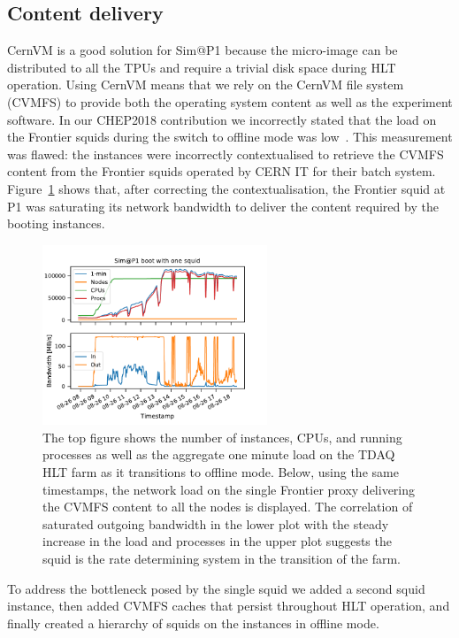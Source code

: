 \documentclass{webofc}
\begin{document}
\subsection{Content delivery}
CernVM is a good solution for Sim@P1 because the micro-image can be distributed
to all the TPUs and require a trivial disk space during HLT operation. Using
CernVM means that we rely on the CernVM file system (CVMFS) to provide both the
operating system content as well as the experiment software. In our CHEP2018
contribution we incorrectly stated that the load on the Frontier squids during
the switch to offline mode was low~\cite{Berghaus:2019wuj, Dykstra:2019}.
This measurement was flawed: the instances were incorrectly contextualised to
retrieve the CVMFS content from the Frontier squids operated by CERN IT for
their batch system. Figure~\ref{fig:single_proxy} shows that, after correcting
the contextualisation, the Frontier squid at P1 was saturating its network
bandwidth to deliver the content required by the booting instances.
\begin{figure}[h]
\centering
\sidecaption\includegraphics[width=0.6\textwidth,clip]{single_squid}
\caption{The top figure shows the number of instances, CPUs, and running
        processes as well as the aggregate one minute load on the TDAQ HLT farm
        as it transitions to offline mode. Below, using the same timestamps,
        the network load on the single Frontier proxy delivering the CVMFS
        content to all the nodes is displayed. The correlation of saturated
        outgoing bandwidth in the lower plot with the steady increase in the
        load and processes in the upper plot suggests the squid is the rate
        determining system in the transition of the farm.}\label{fig:single_proxy}
\end{figure}
To address the bottleneck posed by the single squid we added a second squid
instance, then added CVMFS caches that persist throughout HLT operation, and
finally created a hierarchy of squids on the instances in offline mode.
\end{document}

